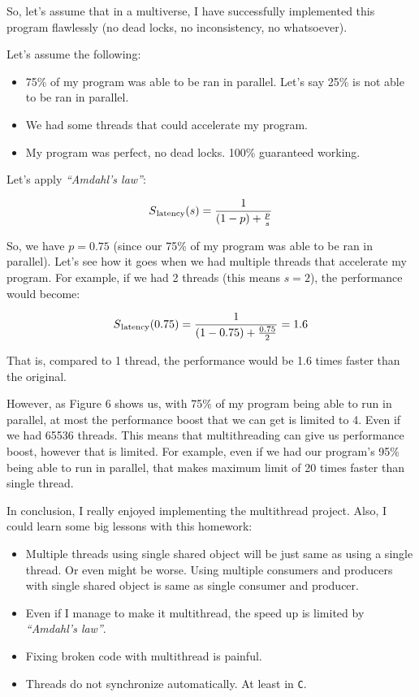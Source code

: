 \documentclass{homework}
\begin{document}
So, let’s assume that in a multiverse, I have successfully implemented this program flawlessly (no dead locks, no inconsistency, no whatsoever). 
\par

Let’s assume the following:
\begin{itemize}
    \item 75\% of my program was able to be ran in parallel. Let’s say 25\% is not able to be ran in parallel.
    \item We had some threads that could accelerate my program.
    \item My program was perfect, no dead locks. 100\% guaranteed working.
\end{itemize}

Let’s apply \textit{“Amdahl's law”}:

\[
    S\textsubscript{latency}(s) = \frac{1}{(1-p) + \frac{p}{s}}
\]

So, we have $p=0.75$ (since our 75\% of my program was able to be ran in parallel). Let's see how it goes when we had multiple threads that accelerate my program. For example, if we had 2 threads (this means $s=2$), the performance would become:

\[
    S\textsubscript{latency}(0.75) = \frac{1}{(1-0.75) + \frac{0.75}{2}} = 1.6
\]

That is, compared to 1 thread, the performance would be 1.6 times faster than the original. 
\pagebreak

However, as Figure 6 shows us, with 75\% of my program being able to run in parallel, at most the performance boost that we can get is limited to 4. Even if we had 65536 threads. This means that multithreading can give us performance boost, however that is limited. For example, even if we had our program's 95\% being able to run in parallel, that makes maximum limit of 20 times faster than single thread. 

In conclusion, I really enjoyed implementing the multithread project. Also, I could learn some big lessons with this homework:
\begin{itemize}
    \item Multiple threads using single shared object will be just same as using a single thread. Or even might be worse. Using multiple consumers and producers with single shared object is same as single consumer and producer. 
    \item Even if I manage to make it multithread, the speed up is limited by \textit{“Amdahl's law”}.
    \item Fixing broken code with multithread is painful.
    \item Threads do not synchronize automatically. At least in \texttt{C}.
\end{itemize}
\end{document}
